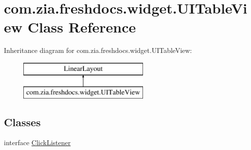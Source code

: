 \hypertarget{classcom_1_1zia_1_1freshdocs_1_1widget_1_1_u_i_table_view}{\section{com.\-zia.\-freshdocs.\-widget.\-U\-I\-Table\-View Class Reference}
\label{classcom_1_1zia_1_1freshdocs_1_1widget_1_1_u_i_table_view}
}
Inheritance diagram for com.\-zia.\-freshdocs.\-widget.\-U\-I\-Table\-View\-:\begin{figure}[H]
\begin{center}
\leavevmode
\includegraphics[height=2.000000cm]{classcom_1_1zia_1_1freshdocs_1_1widget_1_1_u_i_table_view}
\end{center}
\end{figure}
\subsection*{Classes}
\begin{DoxyCompactItemize}
\item 
interface \hyperlink{interfacecom_1_1zia_1_1freshdocs_1_1widget_1_1_u_i_table_view_1_1_click_listener}{Click\-Listener}
\end{DoxyCompactItemize}

